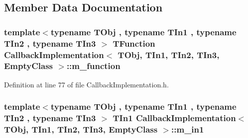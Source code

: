 \subsection{Member Data Documentation}
\hypertarget{class_callback_implementation_3_01_t_obj_00_01_t_in1_00_01_t_in2_00_01_t_in3_00_01_empty_class_01_4_ad80fbd84a7b3a1fdd0874741f27487dd}{
\subsubsection[{m\-\_\-function}]{\setlength{\rightskip}{0pt plus 5cm}template$<$typename T\-Obj , typename T\-In1 , typename T\-In2 , typename T\-In3 $>$ {\bf T\-Function} {\bf Callback\-Implementation}$<$ T\-Obj, T\-In1, T\-In2, T\-In3, {\bf Empty\-Class} $>$\-::m\-\_\-function\hspace{0.3cm}{\ttfamily [private]}}}\label{class_callback_implementation_3_01_t_obj_00_01_t_in1_00_01_t_in2_00_01_t_in3_00_01_empty_class_01_4_ad80fbd84a7b3a1fdd0874741f27487dd}


Definition at line 77 of file Callback\-Implementation.\-h.

\hypertarget{class_callback_implementation_3_01_t_obj_00_01_t_in1_00_01_t_in2_00_01_t_in3_00_01_empty_class_01_4_afbc18229c67f23d55bd890ca9920231a}{
\subsubsection[{m\-\_\-in1}]{\setlength{\rightskip}{0pt plus 5cm}template$<$typename T\-Obj , typename T\-In1 , typename T\-In2 , typename T\-In3 $>$ T\-In1 {\bf Callback\-Implementation}$<$ T\-Obj, T\-In1, T\-In2, T\-In3, {\bf Empty\-Class} $>$\-::m\-\_\-in1\hspace{0.3cm}{\ttfamily [private]}}}\label{class_callback_implementation_3_01_t_obj_00_01_t_in1_00_01_t_in2_00_01_t_in3_00_01_empty_class_01_4_afbc18229c67f23d55bd890ca9920231a}


